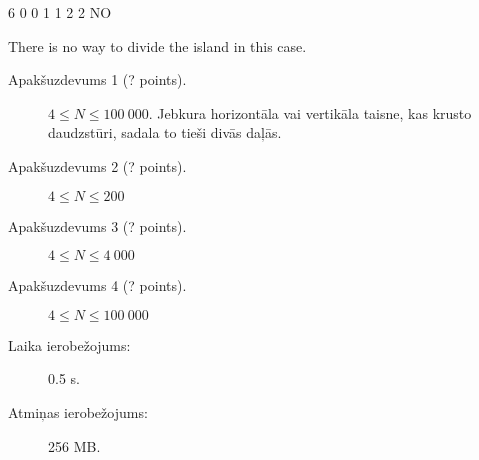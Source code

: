 \documentclass{boi2014-lv}
\begin{document}
	\example
	{
		6  0  0  1  1  2  2
	}
	{
		NO
	}
    {
        There is no way to divide the island in this case.
        \begin{center}
        \end{center}
    }


    \Scoring

    \begin{description}
        \item[Apakšuzdevums 1 (? points).] $4 \le N \le 100\ 000$.
	Jebkura horizontāla vai vertikāla taisne, kas krusto daudzstūri, sadala to tieši divās daļās.

        \item[Apakšuzdevums 2 (? points).] $4 \le N \le 200$
        \item[Apakšuzdevums 3 (? points).] $4 \le N \le 4\ 000$
        \item[Apakšuzdevums 4 (? points).] $4 \le N \le 100\ 000$
    \end{description}

    \Constraints

    \begin{description}
        \item[Laika ierobežojums:] 0.5 s.
        \item[Atmiņas ierobežojums:] 256 MB.
    \end{description}
\end{document}
